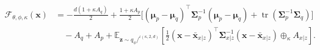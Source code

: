 \documentclass[twoside,11pt]{article}
\begin{document}
\begin{theorem}
\begin{equation*}
\begin{aligned}
\mathcal{F}_{\theta,\phi,\kappa}(\boldsymbol{x}) &=
-\frac{d(1+\kappa A_q)}{2}
+\frac{1+\kappa A_p}{2}
\Big[
(\boldsymbol{\mu}_p-\boldsymbol{\mu}_q)^\top
\boldsymbol{\Sigma}_p^{-1}
(\boldsymbol{\mu}_p-\boldsymbol{\mu}_q)
+\operatorname{tr}(\boldsymbol{\Sigma}_p^{-1}\boldsymbol{\Sigma}_q)
\Big] \\
&\quad
- A_q + A_p
+\mathbb{E}_{\mathbf{z} \sim q_\phi/^{\iota(\kappa,2,d)}}\!\left[\frac{1}{2}
(\boldsymbol{x}-\bar{\boldsymbol{x}}_{x|z})^\top
\boldsymbol{\Sigma}_{x|z}^{-1}
(\boldsymbol{x}-\bar{\boldsymbol{x}}_{x|z})
\oplus_\kappa A_{x|z}\right].
\end{aligned}
\end{equation*}
\end{theorem}
\end{document}
